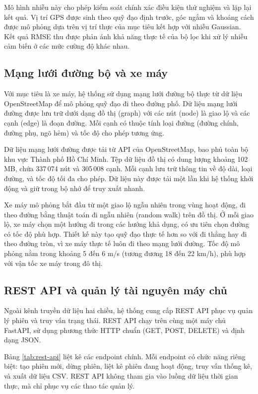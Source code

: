 Mô hình nhiễu này cho phép kiểm soát chính xác điều kiện thử nghiệm và lặp lại kết quả. Vị trí GPS được sinh theo quỹ đạo định trước, góc ngắm và khoảng cách được mô phỏng dựa trên vị trí thực của mục tiêu kết hợp với nhiễu Gaussian. Kết quả RMSE thu được phản ánh khả năng thực tế của bộ lọc khi xử lý nhiễu cảm biến ở các mức cường độ khác nhau.

\subsection{Mạng lưới đường bộ và xe máy}

\hspace{0.5cm} Với mục tiêu là xe máy, hệ thống sử dụng mạng lưới đường bộ thực từ dữ liệu OpenStreetMap để mô phỏng quỹ đạo đi theo đường phố. Dữ liệu mạng lưới đường được lưu trữ dưới dạng đồ thị (graph) với các nút (node) là giao lộ và các cạnh (edge) là đoạn đường. Mỗi cạnh có thuộc tính loại đường (đường chính, đường phụ, ngõ hẻm) và tốc độ cho phép tương ứng.

Dữ liệu mạng lưới đường được tải từ API của OpenStreetMap, bao phủ toàn bộ khu vực Thành phố Hồ Chí Minh. Tệp dữ liệu đồ thị có dung lượng khoảng 102 MB, chứa 337\,074 nút và 305\,008 cạnh. Mỗi cạnh lưu trữ thông tin về độ dài, loại đường, và tốc độ tối đa cho phép. Dữ liệu này được tải một lần khi hệ thống khởi động và giữ trong bộ nhớ để truy xuất nhanh.

Xe máy mô phỏng bắt đầu từ một giao lộ ngẫu nhiên trong vùng hoạt động, đi theo đường bằng thuật toán đi ngẫu nhiên (random walk) trên đồ thị. Ở mỗi giao lộ, xe máy chọn một hướng đi trong các hướng khả dụng, có ưu tiên chọn đường có tốc độ phù hợp. Thiết kế này tạo quỹ đạo thực tế hơn so với đi thẳng hay đi theo đường tròn, vì xe máy thực tế luôn đi theo mạng lưới đường. Tốc độ mô phỏng nằm trong khoảng 5 đến 6 m/s (tương đương 18 đến 22 km/h), phù hợp với vận tốc xe máy trong đô thị.

\subsection{REST API và quản lý tài nguyên máy chủ}

\hspace{0.5cm} Ngoài kênh truyền dữ liệu hai chiều, hệ thống cung cấp REST API phục vụ quản lý phiên và truy vấn trạng thái. REST API chạy trên cùng một máy chủ FastAPI, sử dụng phương thức HTTP chuẩn (GET, POST, DELETE) và định dạng JSON.

Bảng \ref{tab:rest-api} liệt kê các endpoint chính. Mỗi endpoint có chức năng riêng biệt: tạo phiên mới, dừng phiên, liệt kê phiên đang hoạt động, truy vấn thống kê, và xuất dữ liệu CSV. REST API không tham gia vào luồng dữ liệu thời gian thực, mà chỉ phục vụ các thao tác quản lý.

